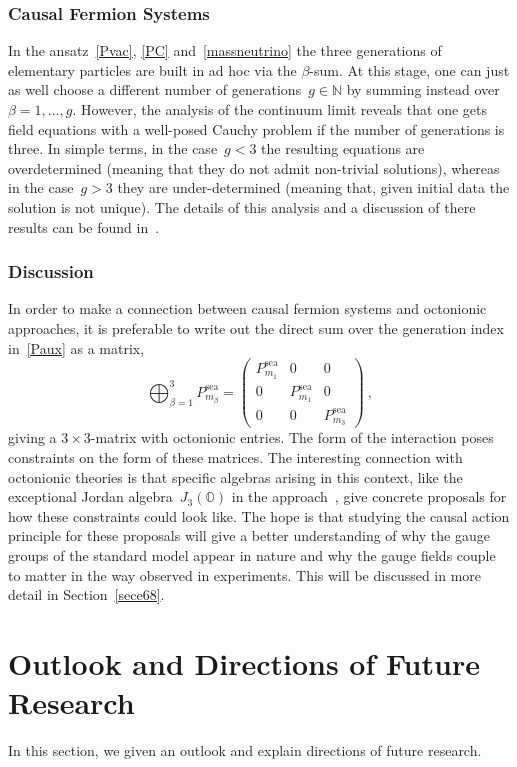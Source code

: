 \documentclass[reqno,11pt]{amsart}
\numberwithin{equation}{section}
\newcommand{\1}{\mbox{\rm 1 \hspace{-1.05 em} 1}}
\newcommand{\N}{\mathbb{N}}
\newcommand{\bb}[1]{\mathbb{#1}}
\begin{document}
\subsubsection{Causal Fermion Systems}
In the ansatz~\eqref{Pvac}, \eqref{PC} and~\eqref{massneutrino} the three generations of
elementary particles are built in ad hoc via the $\beta$-sum. At this stage, one can just as well
choose a different number of generations~$g \in \N$ by summing instead over~$\beta=1,\ldots, g$.
However, the analysis of the continuum limit reveals that one gets field equations with a well-posed
Cauchy problem if the number of generations is three. In simple terms, in the case~$g<3$ the resulting
equations are overdetermined (meaning that they do not admit non-trivial solutions), whereas in the
case~$g>3$ they are under-determined (meaning that, given initial data the solution is not unique).
The details of this analysis and a discussion of there results can be found in~\cite[Section~3.7]{cfs}.

\subsubsection{Discussion}
In order to make a connection between causal fermion systems and octonionic approaches,
it is preferable to write out the direct sum over the generation index in~\eqref{Paux} as a matrix,
\[ \bigoplus_{\beta=1}^3 
{P^\text{sea}_{m_\beta}} = \begin{pmatrix} P^\text{sea}_{m_1} & 0 & 0 \\
0 & P^\text{sea}_{m_1} & 0 \\ 0 & 0 & P^\text{sea}_{m_3} \end{pmatrix} \:, \]
giving a $3 \times 3$-matrix with octonionic entries.
The form of the interaction poses constraints on the form of these matrices.
The interesting connection with octonionic theories is that specific algebras arising in this context,
like the exceptional Jordan algebra~$J_3(\bb{O})$ in the approach~\cite{singh-jordan, singh-octo3}, give concrete proposals for how these constraints could look like. 
The hope is that studying the causal action principle for
these proposals will give a better understanding of why the gauge groups of the standard model appear in nature
and why the gauge fields couple to matter in the way observed in experiments.
This will be discussed in more detail in Section~\ref{sece68}.

\section{Outlook and Directions of Future Research} \label{secoutlook}
In this section, we given an outlook and explain directions of future research.
\end{document}
